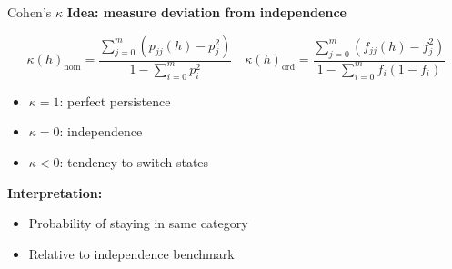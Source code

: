 \documentclass{beamer}
\begin{document}
\begin{frame}{Cohen's $\kappa$}
\textbf{Idea: measure deviation from independence}

\vspace{0.5cm}

\[
\kappa(h)_{\mathrm{nom}} =
\frac{\sum_{j=0}^{m} (p_{jj}(h) - p_j^2)}
{1 - \sum_{i=0}^{m} p_i^2} \quad
\kappa(h)_{\mathrm{ord}} =
\frac{\sum_{j=0}^{m} (f_{jj}(h) - f_j^2)}
{1 - \sum_{i=0}^{m} f_i(1 - f_i)}
\]

\vspace{0.5cm}

\begin{itemize}
    \item $\kappa = 1$: perfect persistence
    \item $\kappa = 0$: independence
    \item $\kappa < 0$: tendency to switch states
\end{itemize}

\vspace{0.5cm}

\textbf{Interpretation:}
\begin{itemize}
    \item Probability of staying in same category
    \item Relative to independence benchmark
\end{itemize}
\end{frame}
\end{document}
